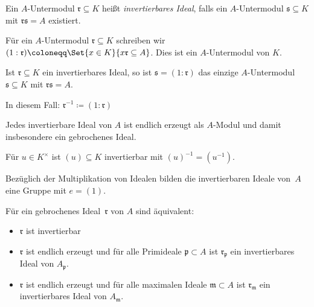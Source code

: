 \documentclass{cheat-sheet}
\newcommand{\ppp}{\mathfrak{p}}
\newcommand{\rrr}{\mathfrak{r}}
\newcommand{\sss}{\mathfrak{s}}
\newcommand{\mmm}{\mathfrak{m}}
\begin{document}

\begin{defn}
  Ein $A$-Untermodul $\rrr \subseteq K$ heißt \emph{invertierbares Ideal}, falls ein $A$-Untermodul $\sss \subseteq K$ mit $\rrr \sss = A$ existiert.
\end{defn}

\begin{nota}
  Für ein $A$-Untermodul $\rrr \subseteq K$ schreiben wir $(1 : \rrr) \coloneqq \Set{x \in K}{x \rrr \subseteq A}$.
  Dies ist ein $A$-Untermodul von $K$.
\end{nota}

\begin{prop}
  Ist $\rrr \subseteq K$ ein invertierbares Ideal, so ist $\sss = (1 : \rrr)$ das einzige $A$-Untermodul $\sss \subseteq K$ mit $\rrr \sss = A$.
\end{prop}

\begin{nota}
  In diesem Fall: \enspace
  $\rrr^{-1} \coloneqq (1 : \rrr)$
\end{nota}

\begin{prop}
  Jedes invertierbare Ideal von $A$ ist endlich erzeugt als $A$-Modul und damit insbesondere ein gebrochenes Ideal.
\end{prop}

\begin{bsp}
  Für $u \in K^{\times}$ ist $(u) \subseteq K$ invertierbar mit $(u)^{-1} = (u^{-1})$.
\end{bsp}

\begin{bem}
  Bezüglich der Multiplikation von Idealen bilden die invertierbaren Ideale von~$A$ eine Gruppe mit $e = (1)$.
\end{bem}

\begin{prop}
  Für ein gebrochenes Ideal~$\rrr$ von $A$ sind äquivalent:
  \begin{itemize}
    \item $\rrr$ ist invertierbar
    \item $\rrr$ ist endlich erzeugt und für alle Primideale $\ppp \subset A$ ist $\rrr_\ppp$ ein invertierbares Ideal von $A_\ppp$.
    \item $\rrr$ ist endlich erzeugt und für alle maximalen Ideale $\mmm \subset A$ ist $\rrr_\mmm$ ein invertierbares Ideal von $A_\mmm$.
  \end{itemize}
\end{prop}
\end{document}
